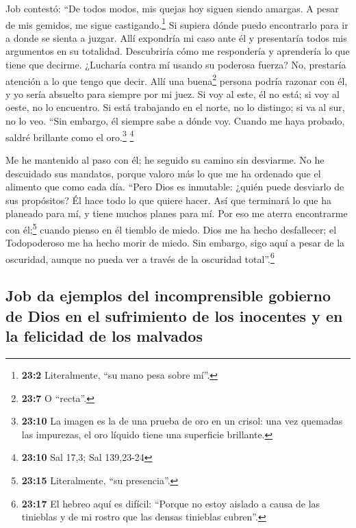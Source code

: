  Job contestó:  ``De todos modos, mis quejas
hoy siguen siendo amargas. A pesar de mis gemidos, me sigue
castigando.\footnote{\textbf{23:2} Literalmente, ``su mano pesa sobre
  mí''.}  Si supiera dónde puedo encontrarlo para ir a
donde se sienta a juzgar.  Allí expondría mi caso ante él
y presentaría todos mis argumentos en su totalidad. 
Descubriría cómo me respondería y aprendería lo que tiene que decirme.
 ¿Lucharía contra mí usando su poderosa fuerza? No,
prestaría atención a lo que tengo que decir.  Allí una
buena\footnote{\textbf{23:7} O ``recta''.} persona podría razonar con
él, y yo sería absuelto para siempre por mi juez.  Si voy
al este, él no está; si voy al oeste, no lo encuentro.  Si
está trabajando en el norte, no lo distingo; si va al sur, no lo veo.
 ``Sin embargo, él siempre sabe a dónde voy. Cuando me
haya probado, saldré brillante como el oro.\footnote{\textbf{23:10} La
  imagen es la de una prueba de oro en un crisol: una vez quemadas las
  impurezas, el oro líquido tiene una superficie brillante.} \footnote{\textbf{23:10}
  Sal 17,3; Sal 139,23-24}

 Me he mantenido al paso con él; he seguido su camino sin
desviarme.  No he descuidado sus mandatos, porque valoro
más lo que me ha ordenado que el alimento que como cada día.
 ``Pero Dios es inmutable: ¿quién puede desviarlo de sus
propósitos? Él hace todo lo que quiere hacer.  Así que
terminará lo que ha planeado para mí, y tiene muchos planes para mí.
 Por eso me aterra encontrarme con él;\footnote{\textbf{23:15}
  Literalmente, ``su presencia''.} cuando pienso en él tiemblo de miedo.
 Dios me ha hecho desfallecer; el Todopoderoso me ha
hecho morir de miedo.  Sin embargo, sigo aquí a pesar de
la oscuridad, aunque no pueda ver a través de la oscuridad
total''.\footnote{\textbf{23:17} El hebreo aquí es difícil: ``Porque no
  estoy aislado a causa de las tinieblas y de mi rostro que las densas
  tinieblas cubren''.}

\hypertarget{job-da-ejemplos-del-incomprensible-gobierno-de-dios-en-el-sufrimiento-de-los-inocentes-y-en-la-felicidad-de-los-malvados}{%
\subsection{Job da ejemplos del incomprensible gobierno de Dios en el
sufrimiento de los inocentes y en la felicidad de los
malvados}\label{job-da-ejemplos-del-incomprensible-gobierno-de-dios-en-el-sufrimiento-de-los-inocentes-y-en-la-felicidad-de-los-malvados}}

